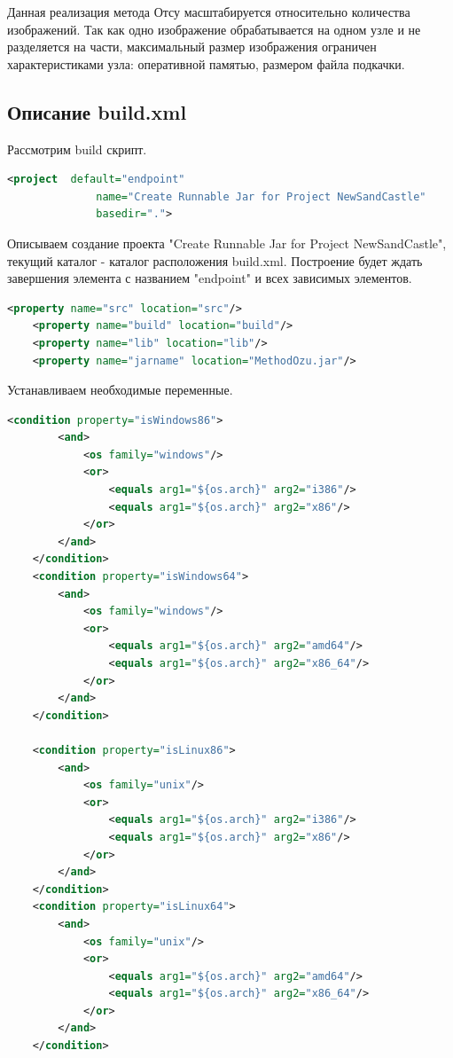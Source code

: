 \documentclass[12pt,a4paper]{extarticle} %
\begin{document}
Данная реализация метода Отсу масштабируется относительно количества изображений. Так как одно изображение обрабатывается на одном узле и не разделяется на части, максимальный размер изображения ограничен характеристиками узла: оперативной памятью, размером файла подкачки.

\newpage
\subsection{Описание build.xml}
    Рассмотрим build скрипт.

\begin{lstlisting}[language=xml]
    <project  default="endpoint" 
              name="Create Runnable Jar for Project NewSandCastle" 
              basedir=".">
\end{lstlisting}
    
    Описываем создание проекта "Create Runnable Jar for Project NewSandCastle", текущий каталог - каталог расположения build.xml. Построение будет ждать завершения элемента с названием "endpoint" и всех зависимых элементов.
\begin{lstlisting}[language=xml]
    <property name="src" location="src"/>
    <property name="build" location="build"/>
    <property name="lib" location="lib"/>    
    <property name="jarname" location="MethodOzu.jar"/>
\end{lstlisting}

    Устанавливаем необходимые переменные.
\begin{lstlisting}[language=xml]
    <condition property="isWindows86">
        <and>
            <os family="windows"/>
            <or>
                <equals arg1="${os.arch}" arg2="i386"/>
                <equals arg1="${os.arch}" arg2="x86"/>
            </or>
        </and>
    </condition>
    <condition property="isWindows64">
        <and>
            <os family="windows"/>
            <or>
                <equals arg1="${os.arch}" arg2="amd64"/>
                <equals arg1="${os.arch}" arg2="x86_64"/>
            </or>
        </and>        
    </condition>

    <condition property="isLinux86">
        <and>        
            <os family="unix"/>
            <or>
                <equals arg1="${os.arch}" arg2="i386"/>
                <equals arg1="${os.arch}" arg2="x86"/>
            </or>
        </and>
    </condition>
    <condition property="isLinux64">
        <and>
            <os family="unix"/>
            <or>
                <equals arg1="${os.arch}" arg2="amd64"/>
                <equals arg1="${os.arch}" arg2="x86_64"/>
            </or>
        </and>        
    </condition>
\end{lstlisting}
\end{document}
